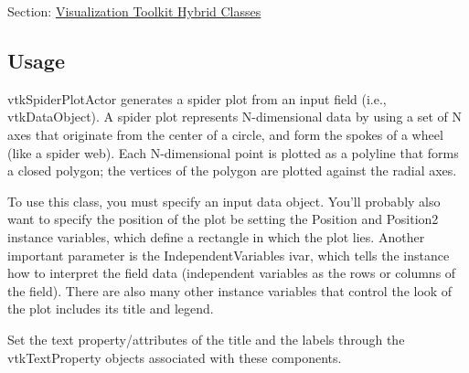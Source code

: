 Section\-: \hyperlink{sec_vtkhybrid}{Visualization Toolkit Hybrid Classes} \hypertarget{vtkwidgets_vtkxyplotwidget_Usage}{}\subsection{Usage}\label{vtkwidgets_vtkxyplotwidget_Usage}
vtk\-Spider\-Plot\-Actor generates a spider plot from an input field (i.\-e., vtk\-Data\-Object). A spider plot represents N-\/dimensional data by using a set of N axes that originate from the center of a circle, and form the spokes of a wheel (like a spider web). Each N-\/dimensional point is plotted as a polyline that forms a closed polygon; the vertices of the polygon are plotted against the radial axes.

To use this class, you must specify an input data object. You'll probably also want to specify the position of the plot be setting the Position and Position2 instance variables, which define a rectangle in which the plot lies. Another important parameter is the Independent\-Variables ivar, which tells the instance how to interpret the field data (independent variables as the rows or columns of the field). There are also many other instance variables that control the look of the plot includes its title and legend.

Set the text property/attributes of the title and the labels through the vtk\-Text\-Property objects associated with these components.

